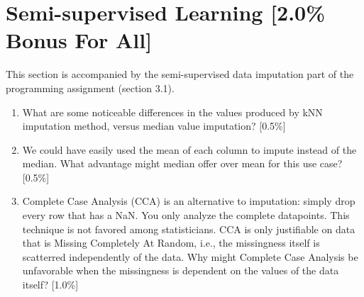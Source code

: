 \section{Semi-supervised Learning [2.0\% Bonus For All]}
This section is accompanied by the semi-supervised data imputation part of the programming assignment (section 3.1).
\begin{enumerate}
    \item What are some noticeable differences in the values produced by kNN imputation method, versus median value imputation? [0.5\%]

    \item We could have easily used the mean of each column to impute instead of the median. What advantage might median offer over mean for this use case? [0.5\%]

    \item Complete Case Analysis (CCA) is an alternative to imputation: simply drop every row that has a NaN. You only analyze the complete datapoints. This technique is not favored among statisticians. CCA is only justifiable on data that is Missing Completely At Random, i.e., the missingness itself is scatterred independently of the data. Why might Complete Case Analysis be unfavorable when the missingness is dependent on the values of the data itself? [1.0\%]
\end{enumerate}
\newpage

